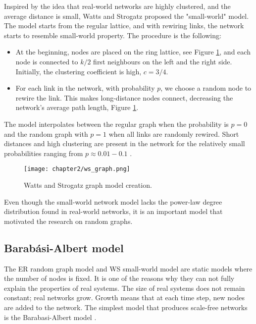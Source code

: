 Inspired by the idea that real-world networks are highly clustered, and the average distance is small, Watts and Strogatz \cite{watts1998collective} proposed the "small-world" model. The model starts from the regular lattice, and with rewiring links, the network starts to resemble small-world property. The procedure is the following:

\begin{itemize}
	\item At the beginning, nodes are placed on the ring lattice, see Figure \ref{fig:wsgraph}, and each node is connected to $k/2$ first neighbours on the left and the right side. Initially, the clustering coefficient is high, $c=3/4$. 
	\item For each link in the network, with probability $p$, we choose a random node to rewire the link. This makes long-distance nodes connect, decreasing the network's average path length, Figure \ref{fig:wsgraph}.
\end{itemize}

The model interpolates between the regular graph when the probability is $p=0$ and the random graph with $p=1$ when all links are randomly rewired. Short distances and high clustering are present in the network  for the relatively small probabilities ranging from $p \approx 0.01 - 0.1$ \cite{watts1998collective}. %

\begin{figure}[H]
	\centering
	\texttt{[image: chapter2/ws\_graph.png]}
	\caption[Watts and Strogatz graph model creation]{Watts and Strogatz graph model creation.}
	\label{fig:wsgraph}
\end{figure}

Even though the small-world network model lacks the power-law degree distribution found in real-world networks, it is an important model that motivated the research on random graphs. 

\subsection{Barab\' {a}si-Albert model}

The ER random graph model and WS small-world model are static models where the number of nodes is fixed. It is one of the reasons why they can not fully explain the properties of real systems. The size of real systems does not remain constant; real networks grow. Growth means that at each time step, new nodes are added to the network. The simplest model that produces scale-free networks is the Barabasi-Albert model \cite{barabasi1999}.

